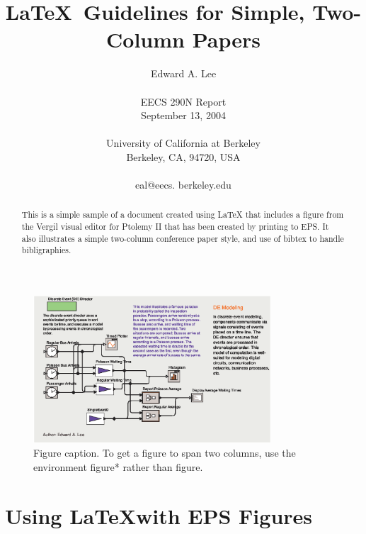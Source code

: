 \documentclass[10pt,twocolumn]{article}
\begin{document}
\title{\LaTeX\ Guidelines for Simple, Two-Column Papers}

\author{Edward A. Lee\\
\\
EECS 290N Report\\
September 13, 2004 \\
\\
University of California at Berkeley\\
Berkeley, CA, 94720, USA\\
\\
eal@eecs. berkeley.edu\\
}

\maketitle
\thispagestyle{empty}

\begin{abstract}
   This is a simple sample of a document created using \LaTeX
   that includes a figure from the Vergil visual editor for Ptolemy II
   that has been created by printing to EPS.
   It also illustrates a simple two-column conference paper style,
   and use of bibtex to handle bibligraphies.
\end{abstract}

\begin{figure}[!b]
  \begin{center}
    \includegraphics[width=3.5in]{figure.eps}
  \end{center}

  \caption{\small Figure caption. To get a figure to span two
      columns, use the environment figure* rather than figure.}
  \label{fig-label}
\end{figure}

\section{Using \LaTeX with EPS Figures}
\end{document}
